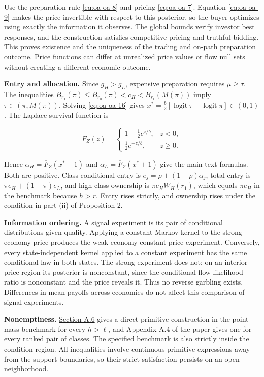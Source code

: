 \documentclass[
  11pt,
]{article}
\begin{document}
Use the preparation rule \eqref{eq:oa-oa-8} and pricing
\eqref{eq:oa-oa-7}. Equation \eqref{eq:oa-oa-9} makes the price
invertible with respect to this posterior, so the buyer optimizes using
exactly the information it observes. The global bounds verify investor
best responses, and the construction satisfies competitive pricing and
truthful bidding. This proves existence and the uniqueness of the
trading and on-path preparation outcome. Price functions can differ at
unrealized price values or flow null sets without creating a different
economic outcome.

\textbf{Entry and allocation.} Since \(g_H>g_L\), expensive preparation
requires \(\mu\ge\tau\). The inequalities
\(B_{r_1}(\pi)\le B_{r_0}(\pi)<c_H<B_{r_1}(M(\pi))\) imply
\(\tau\in(\pi,M(\pi))\). Solving \eqref{eq:oa-oa-16} gives
\(x^*=\frac b2[\operatorname{logit}\tau-\operatorname{logit}\pi]\in(0,1)\). The Laplace survival
function is

\[
\overline F_Z(z)=
\begin{cases}
1-\tfrac12e^{z/b},&z<0,\\
\tfrac12e^{-z/b},&z\ge0.
\end{cases}
\tag{OA.17}\label{eq:oa-oa-17}
\]

Hence \(\alpha_H=\overline F_Z(x^*-1)\) and
\(\alpha_L=\overline F_Z(x^*+1)\) give the main-text formulas. Both are
positive. Class-conditional entry is
\(e_j=\rho+(1-\rho)\alpha_j\), total entry is \(\pi e_H+(1-\pi)e_L\),
and high-class ownership is \(\pi e_HW_H(r_1)\), which equals \(\pi e_H\)
in the benchmark because \(h>r\). Entry rises strictly, and ownership
rises under the condition in part (ii) of Proposition 2.

\textbf{Information ordering.} A signal experiment is its pair of
conditional distributions given quality. Applying a constant Markov
kernel to the strong-economy price produces the weak-economy constant
price experiment. Conversely, every state-independent kernel applied to
a constant experiment has the same conditional law in both states. The
strong experiment does not: on an interior price region its posterior is
nonconstant, since the conditional flow likelihood ratio is nonconstant
and the price reveals it. Thus no reverse garbling exists. Differences
in mean payoffs across economies do not affect this comparison of signal
experiments.

\textbf{Nonemptiness.} \hyperref[oa-a-extensions]{Section A.6} gives a
direct primitive construction in the point-mass benchmark for every
\(h>\ell\), and Appendix A.4 of the paper gives one for every ranked pair
of classes. The specified benchmark is also strictly inside the
condition region. All inequalities
involve continuous primitive expressions away from the support
boundaries, so their strict satisfaction persists on an open
neighborhood.
\end{document}
